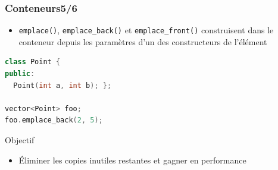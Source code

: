 \documentclass[C++.tex]{subfiles}
\begin{document}
\begin{frame}[fragile]
	\frametitle{Conteneurs\titlehfill{}5/6}
	\begin{itemize}
		\item \lstinline|emplace()|, \lstinline|emplace_back()| et \lstinline|emplace_front()| construisent dans le conteneur depuis les paramètres d'un des constructeurs de l'élément
	\end{itemize}

	\begin{lstlisting}[language=C++]
class Point {
public:
  Point(int a, int b); };

vector<Point> foo;
foo.emplace_back(2, 5);\end{lstlisting}

	\begin{block}{Objectif}
		\begin{itemize}
			\item Éliminer les copies inutiles restantes et gagner en performance
		\end{itemize}

	\end{block}
\end{frame}
\end{document}
